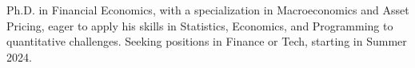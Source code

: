 

\begin{cvparagraph}
	Ph.D. in Financial Economics, with a specialization in Macroeconomics and Asset Pricing, eager to apply his skills in Statistics, Economics, and Programming to quantitative challenges. Seeking positions in Finance or Tech, starting in Summer 2024.
\end{cvparagraph}
